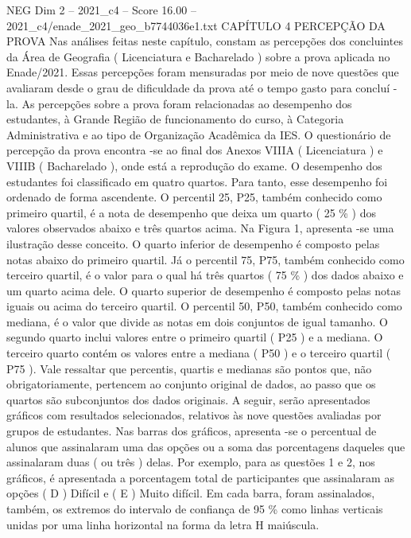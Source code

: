 \begin{textsample}{NEG Dim 2 – 2021\_c4 – Score 16.00 – 2021\_c4/enade\_2021\_geo\_b7744036e1.txt}  \label{ex:f2_neg_395}
CAPÍTULO 4 PERCEPÇÃO DA PROVA Nas análises feitas neste capítulo, constam as percepções dos concluintes da Área de Geografia ( Licenciatura e Bacharelado ) sobre a prova aplicada no Enade/2021.
Essas percepções foram mensuradas por meio de nove questões que avaliaram desde o grau de dificuldade da prova até o tempo gasto para concluí -la.
As percepções sobre a prova foram relacionadas ao desempenho dos estudantes, à Grande Região de funcionamento do curso, à Categoria Administrativa e ao tipo de Organização Acadêmica da IES.
O questionário de percepção da prova encontra -se ao final dos Anexos VIIIA ( Licenciatura ) e VIIIB ( Bacharelado ), onde está a reprodução do exame.
O desempenho dos estudantes foi classificado em quatro quartos.
Para tanto, esse desempenho foi ordenado de forma ascendente.
O percentil 25, P25, também conhecido como primeiro quartil, é a nota de desempenho que deixa um quarto ( 25 \% ) dos valores observados abaixo e três quartos acima.
Na Figura 1, apresenta -se uma ilustração desse conceito.
O quarto inferior de desempenho é composto pelas notas abaixo do primeiro quartil.
Já o percentil 75, P75, também conhecido como terceiro quartil, é o valor para o qual há três quartos ( 75 \% ) dos dados abaixo e um quarto acima dele.
O quarto superior de desempenho é composto pelas notas iguais ou acima do terceiro quartil.
O percentil 50, P50, também conhecido como mediana, é o valor que divide as notas em dois conjuntos de igual tamanho.
O segundo quarto inclui valores entre o primeiro quartil ( P25 ) e a mediana.
O terceiro quarto contém os valores entre a mediana ( P50 ) e o terceiro quartil ( P75 ).
Vale ressaltar que percentis, quartis e medianas são pontos que, não obrigatoriamente, pertencem ao conjunto original de dados, ao passo que os quartos são subconjuntos dos dados originais.
A seguir, serão apresentados gráficos com resultados selecionados, relativos às nove questões avaliadas por grupos de estudantes.
Nas barras dos gráficos, apresenta -se o percentual de alunos que assinalaram uma das opções ou a soma das porcentagens daqueles que assinalaram duas ( ou três ) delas.
Por exemplo, para as questões 1 e 2, nos gráficos, é apresentada a porcentagem total de participantes que assinalaram as opções ( D ) Difícil e ( E ) Muito difícil.
Em cada barra, foram assinalados, também, os extremos do intervalo de confiança de 95 \% como linhas verticais unidas por uma linha horizontal na forma da letra H maiúscula.

\end{textsample}
